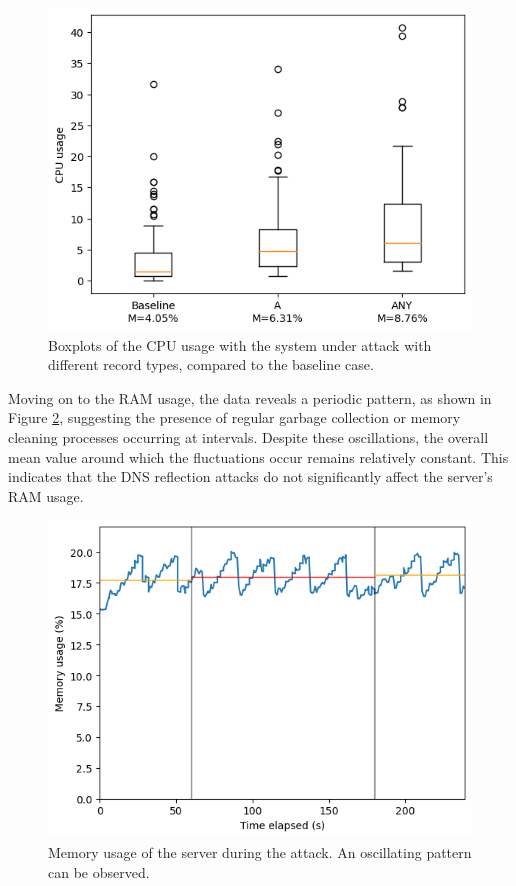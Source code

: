 \begin{figure}[H]
    \centering
    \includegraphics[width=\columnwidth]{Sections/Images/Boxplots_Server.png}
    \caption{Boxplots of the CPU usage with the system under attack with different record types, compared to the baseline case.}
    \label{fig:Boxplots_server}
\end{figure}
\noindent Moving on to the RAM usage, the data reveals a periodic pattern, as shown in Figure \ref{fig:Memory_server}, suggesting the presence of regular garbage collection or memory cleaning processes occurring at intervals. Despite these oscillations, the overall mean value around which the fluctuations occur remains relatively constant. This indicates that the DNS reflection attacks do not significantly affect the server's RAM usage.\\
\begin{figure}[H]
    \centering
    \includegraphics[width=\columnwidth]{Sections/Images/Memory_Server.png}
    \caption{Memory usage of the server during the attack. An oscillating pattern can be observed.}
    \label{fig:Memory_server}
\end{figure}
